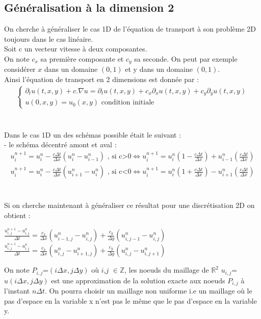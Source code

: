 \documentclass[12pt]{article}
\begin{document}
\subsection{Généralisation à la dimension 2}
\noindent On cherche à généraliser le cas 1D de l'équation de transport à son problème 2D toujours dans le cas linéaire.
\\ Soit c un vecteur vitesse à deux composantes.
\\On note $c_x$ sa première composante et $c_y$ sa seconde.
On peut par exemple considérer $x$ dans un domaine $(0,1)$ et y dans un domaine $(0,1)$.
\\Ainsi l'équation de transport en 2 dimensions est donnée par :
\\
\begin{eqnarray}
      \left\{
        \begin{array}{llll}
            \partial_tu(t,x,y)+c.\nabla u=\partial_tu(t,x,y) +c_x\partial_xu(t,x,y)+c_y\partial_yu(t,x,y)
            \\ u(0,x,y)=u_0(x,y) \text{ condition initiale}
        \end{array}
    \right .
\end{eqnarray}
\\
\\Dans le cas 1D un des schémas possible était le suivant :
\\- le schéma décentré amont et aval :
\begin{eqnarray}
        u^{n+1}_i=u_i^n-\frac{c\Delta t}{\Delta x}({u_{i}^n-u_{i-1}^n}) \text{       , si c>0}
        \iff u^{n+1}_i=u_i^n(1-\frac{c\Delta t}{\Delta x})+u_{i-1}^n(\frac{c\Delta t}{\Delta x})	
        \\u^{n+1}_i=u_i^n-\frac{c\Delta t}{\Delta x}({u_{i+1}^n-u_{i}^n}) \text{       , si c<0}
        \iff u^{n+1}_i=u_i^n(1+\frac{c\Delta t}{\Delta x})-u_{i+1}^n(\frac{c\Delta t}{\Delta x})
\end{eqnarray}
\\
\\Si on cherche maintenant à généraliser ce résultat pour une discrétisation 2D on obtient :
\\
\begin{center}
         $\displaystyle\frac{u_{i,j}^{n+1}-u_{i,j}^{n}}{\Delta t}=\frac{c_x}{\Delta x}(u_{i-1,j}^n-u_{i,j}^n)+\frac{c_y}{\Delta y}(u_{i,j-1}^n-u_{i,j}^n)$
        \\
        $ \displaystyle\frac{u_{i,j}^{n+1}-u_{i,j}^{n}}{\Delta t}=\frac{c_x}{\Delta x}(u_{i,j}^n-u_{i+1,j}^n)+\frac{c_y}{\Delta y}(u_{i,j}^n-u_{i,j+1}^n)$
\end{center}
On note $P_{i,j}$=$(i \Delta x,j \Delta y)$ où $i$,$j$ $\in\mathbb{Z}$, les noeuds du maillage de $\mathbb{R}^2$  $u_{i,j}$=$u(i \Delta x,j \Delta y)$ est une approximation de la solution exacte aux noeuds $P_{i,j}$ à l'instant $n\Delta t$.
On pourra choisir un maillage non uniforme i.e un maillage où le pas d'espace en la variable x n'est pas le même que le pas d'espace en la variable y.
\end{document}
